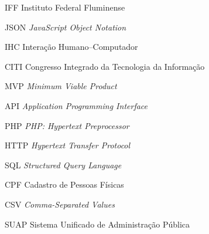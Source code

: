 \begin{siglas}
  \item[IFF] Instituto Federal Fluminense
  \item[JSON] \textit{JavaScript Object Notation}
  \item[IHC] Interação Humano–Computador
  \item[CITI] Congresso Integrado da Tecnologia da Informação
  \item[MVP] \textit{Minimum Viable Product}
  \item[API] \textit{Application Programming Interface}
  \item[PHP] \textit{PHP: Hypertext Preprocessor}
  \item[HTTP] \textit{Hypertext Transfer Protocol}
  \item[SQL] \textit{Structured Query Language}
  \item[CPF] Cadastro de Pessoas Físicas
  \item[CSV] \textit{Comma-Separated Values}
  \item[SUAP] Sistema Unificado de Administração Pública
\end{siglas}